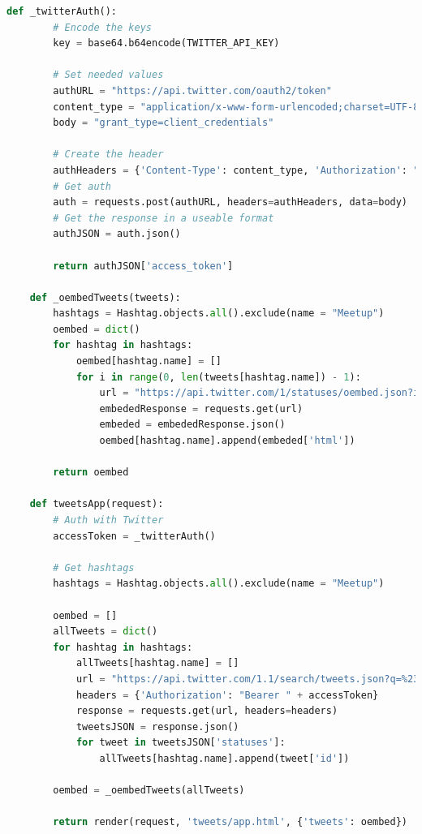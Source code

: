\documentclass[draftclsnofoot,10pt,onecolumn]{IEEEtran} %
\begin{document}
\begin{center}
\captionsetup{width=.5\linewidth}
  \begin{lstlisting}[caption=Views.py showing the Twitter authorization and
  search for tweets from the application., language=Python]
    def _twitterAuth():
        # Encode the keys
        key = base64.b64encode(TWITTER_API_KEY)

        # Set needed values
        authURL = "https://api.twitter.com/oauth2/token"
        content_type = "application/x-www-form-urlencoded;charset=UTF-8"
        body = "grant_type=client_credentials"

        # Create the header
        authHeaders = {'Content-Type': content_type, 'Authorization': "Basic " + key}
        # Get auth
        auth = requests.post(authURL, headers=authHeaders, data=body)
        # Get the response in a useable format
        authJSON = auth.json()
        
        return authJSON['access_token']

    def _oembedTweets(tweets):
        hashtags = Hashtag.objects.all().exclude(name = "Meetup")
        oembed = dict()
        for hashtag in hashtags:
            oembed[hashtag.name] = []
            for i in range(0, len(tweets[hashtag.name]) - 1):
                url = "https://api.twitter.com/1/statuses/oembed.json?id=" + str(tweets[hashtag.name][i])
                embededResponse = requests.get(url)
                embeded = embededResponse.json()
                oembed[hashtag.name].append(embeded['html'])

        return oembed

    def tweetsApp(request):
        # Auth with Twitter
        accessToken = _twitterAuth()

        # Get hashtags
        hashtags = Hashtag.objects.all().exclude(name = "Meetup")

        oembed = []
        allTweets = dict()
        for hashtag in hashtags:
            allTweets[hashtag.name] = []
            url = "https://api.twitter.com/1.1/search/tweets.json?q=%23" + hashtag.name + "+%23Meetup&src=typd"
            headers = {'Authorization': "Bearer " + accessToken}
            response = requests.get(url, headers=headers)
            tweetsJSON = response.json()
            for tweet in tweetsJSON['statuses']:
                allTweets[hashtag.name].append(tweet['id'])

        oembed = _oembedTweets(allTweets)

        return render(request, 'tweets/app.html', {'tweets': oembed})
  \end{lstlisting}
\end{center}
\end{document}
